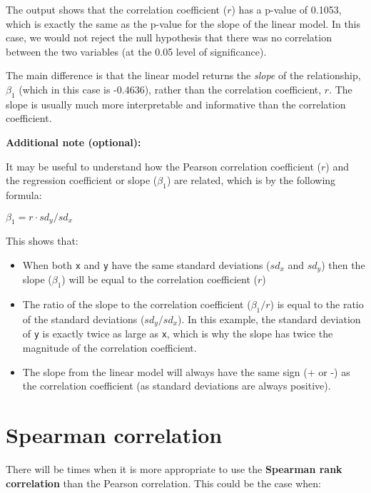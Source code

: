 \documentclass[
  12pt,
]{krantz}
\providecommand{\tightlist}{%
  \setlength{\itemsep}{0pt}\setlength{\parskip}{0pt}}
\begin{document}
The output shows that the correlation coefficient (\(r\)) has a p-value of 0.1053, which is exactly the same as the p-value for the slope of the linear model. In this case, we would not reject the null hypothesis that there was no correlation between the two variables (at the 0.05 level of significance).

The main difference is that the linear model returns the \emph{slope} of the relationship, \(\beta_1\) (which in this case is -0.4636), rather than the correlation coefficient, \(r\). The slope is usually much more interpretable and informative than the correlation coefficient.

\textbf{Additional note (optional):}

It may be useful to understand how the Pearson correlation coefficient (\(r\)) and the regression coefficient or slope (\(\beta_1\)) are related, which is by the following formula:

\begin{center}

\(\beta_1 = r \cdot sd_y / sd_x\)

\end{center}

This shows that:

\begin{itemize}
\tightlist
\item
  When both \texttt{x} and \texttt{y} have the same standard deviations (\(sd_x\) and \(sd_y\)) then the slope (\(\beta_1\)) will be equal to the correlation coefficient (\(r\))
\item
  The ratio of the slope to the correlation coefficient (\(\beta_1 / r\)) is equal to the ratio of the standard deviations (\(sd_y / sd_x\)). In this example, the standard deviation of \texttt{y} is exactly twice as large as \texttt{x}, which is why the slope has twice the magnitude of the correlation coefficient.
\item
  The slope from the linear model will always have the same sign (+ or -) as the correlation coefficient (as standard deviations are always positive).
\end{itemize}

\hypertarget{spearman-correlation}{%
\section{Spearman correlation}\label{spearman-correlation}}

There will be times when it is more appropriate to use the \textbf{Spearman rank correlation} than the Pearson correlation. This could be the case when:
\end{document}
